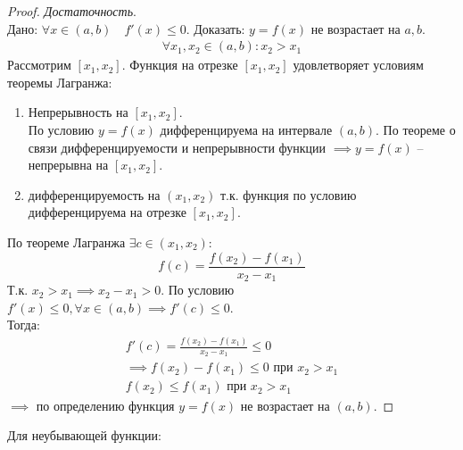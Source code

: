 \begin{proof}
  \textit{Достаточность}. \\
  Дано: $\forall x \in (a, b) \quad f'(x) \le 0$.
  Доказать: $y = f(x)$ не возрастает на  $a, b$.
   \begin{gather*}
    \forall x_1, x_2 \in (a,b) : x_2 > x_1
  \end{gather*}
  Рассмотрим $[x_1, x_2]$. Функция на отрезке $[x_1, x_2]$ удовлетворяет условиям теоремы Лагранжа:
  \begin{enumerate}
    \item Непрерывность на $[x_1, x_2]$. \\
      По условию $y = f(x)$ дифференцируема на интервале  $(a, b)$. По теореме о связи дифференцируемости и непрерывности функции  $\implies y=f(x)$ -- непрерывна на $[x_1, x_2]$.
    \item дифференцируемость на $(x_1, x_2)$ т.к. функция по условию дифференцируема на отрезке $[x_1, x_2]$.
  \end{enumerate}
  По теореме Лагранжа $\exists c \in (x_1, x_2)$: \[
  f(c) = \frac{f(x_2) - f(x_1)}{x_2 - x_1}
  \] 
  Т.к. $x_2 > x_1 \implies x_2 - x_1 > 0$. По условию $f'(x) \le  0, \forall x \in  (a, b) \implies f'(c) \le 0$. \\
  Тогда:
  \begin{gather*}
    f'(c) = \frac{f(x_2) - f(x_1)}{x_2 - x_1} \le 0 \\
    \implies f(x_2) - f(x_1) \le  0 \text{ при } x_2 > x_1 \\
    f(x_2) \le  f(x_1) \text{ при } x_2 > x_1
  \end{gather*}
  $\implies$ по определению функция $y = f(x)$ не возрастает на $(a, b)$.
\end{proof}
Для неубывающей функции:
